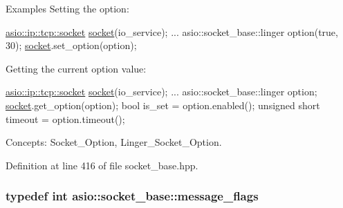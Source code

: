 \begin{DoxyParagraph}{Examples}
Setting the option\+: 
\begin{DoxyCode}
\hyperlink{classasio_1_1basic__stream__socket}{asio::ip::tcp::socket} \hyperlink{namespacewebsocketpp_1_1transport_1_1asio_1_1socket_1_1error_a828ddaa5ed63a761e1b557465a35f05aa0c31b356014843e1d09514e794a539a7}{socket}(io\_service); 
...
asio::socket\_base::linger option(\textcolor{keyword}{true}, 30);
\hyperlink{namespacewebsocketpp_1_1transport_1_1asio_1_1socket_1_1error_a828ddaa5ed63a761e1b557465a35f05aa0c31b356014843e1d09514e794a539a7}{socket}.set\_option(option);
\end{DoxyCode}

\end{DoxyParagraph}
\begin{DoxyParagraph}{}
Getting the current option value\+: 
\begin{DoxyCode}
\hyperlink{classasio_1_1basic__stream__socket}{asio::ip::tcp::socket} \hyperlink{namespacewebsocketpp_1_1transport_1_1asio_1_1socket_1_1error_a828ddaa5ed63a761e1b557465a35f05aa0c31b356014843e1d09514e794a539a7}{socket}(io\_service); 
...
asio::socket\_base::linger option;
\hyperlink{namespacewebsocketpp_1_1transport_1_1asio_1_1socket_1_1error_a828ddaa5ed63a761e1b557465a35f05aa0c31b356014843e1d09514e794a539a7}{socket}.get\_option(option);
\textcolor{keywordtype}{bool} is\_set = option.enabled();
\textcolor{keywordtype}{unsigned} \textcolor{keywordtype}{short} timeout = option.timeout();
\end{DoxyCode}

\end{DoxyParagraph}
\begin{DoxyParagraph}{Concepts\+:}
Socket\+\_\+\+Option, Linger\+\_\+\+Socket\+\_\+\+Option. 
\end{DoxyParagraph}


Definition at line 416 of file socket\+\_\+base.\+hpp.

\hypertarget{classasio_1_1socket__base_ac3cf77465dfedfe1979b5415cf32cc94}{}
\subsubsection[{message\+\_\+flags}]{\setlength{\rightskip}{0pt plus 5cm}typedef int {\bf asio\+::socket\+\_\+base\+::message\+\_\+flags}}\label{classasio_1_1socket__base_ac3cf77465dfedfe1979b5415cf32cc94}


